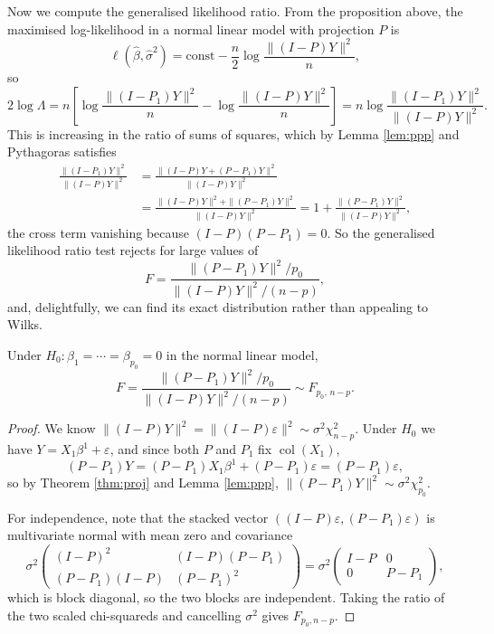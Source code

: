 \documentclass[a4paper]{scrartcl}
\newcommand{\col}{\operatorname{col}}
\begin{document}
Now we compute the generalised likelihood ratio. From the proposition above, the maximised log-likelihood in a normal linear model with projection $P$ is
$$
\ell(\hat\beta,\hat\sigma^2) = \text{const} - \frac{n}{2}\log\frac{\|(I-P)Y\|^2}{n},
$$
so
$$
2\log\Lambda = n\left[\log\frac{\|(I-P_1)Y\|^2}{n} - \log\frac{\|(I-P)Y\|^2}{n}\right] = n\log\frac{\|(I-P_1)Y\|^2}{\|(I-P)Y\|^2}.
$$
This is increasing in the ratio of sums of squares, which by Lemma \ref{lem:ppp} and Pythagoras satisfies
\begin{align*}
  \frac{\|(I-P_1)Y\|^2}{\|(I-P)Y\|^2} &= \frac{\|(I-P)Y + (P-P_1)Y\|^2}{\|(I-P)Y\|^2}\\
  &= \frac{\|(I-P)Y\|^2 + \|(P-P_1)Y\|^2}{\|(I-P)Y\|^2} = 1 + \frac{\|(P-P_1)Y\|^2}{\|(I-P)Y\|^2},
\end{align*}
the cross term vanishing because $(I-P)(P-P_1) = 0$. So the generalised likelihood ratio test rejects for large values of
$$
F = \frac{\|(P-P_1)Y\|^2/p_0}{\|(I-P)Y\|^2/(n-p)},
$$
and, delightfully, we can find its exact distribution rather than appealing to Wilks.

\begin{theorem}
  Under $H_0 : \beta_1 = \cdots = \beta_{p_0} = 0$ in the normal linear model,
  $$
  F = \frac{\|(P-P_1)Y\|^2/p_0}{\|(I-P)Y\|^2/(n-p)} \sim F_{p_0,\,n-p}.
  $$
\end{theorem}
\begin{proof}
  We know $\|(I-P)Y\|^2 = \|(I-P)\varepsilon\|^2\sim\sigma^2\chi^2_{n-p}$. Under $H_0$ we have $Y = X_1\beta^1 + \varepsilon$, and since both $P$ and $P_1$ fix $\col(X_1)$,
  $$
  (P-P_1)Y = (P-P_1)X_1\beta^1 + (P-P_1)\varepsilon = (P-P_1)\varepsilon,
  $$
  so by Theorem \ref{thm:proj} and Lemma \ref{lem:ppp}, $\|(P-P_1)Y\|^2\sim\sigma^2\chi^2_{p_0}$.

  For independence, note that the stacked vector $\left((I-P)\varepsilon, (P-P_1)\varepsilon\right)$ is multivariate normal with mean zero and covariance
  $$
  \sigma^2\begin{pmatrix}(I-P)^2 & (I-P)(P-P_1)\\(P-P_1)(I-P)&(P-P_1)^2\end{pmatrix} = \sigma^2\begin{pmatrix}I-P&0\\0&P-P_1\end{pmatrix},
  $$
  which is block diagonal, so the two blocks are independent. Taking the ratio of the two scaled chi-squareds and cancelling $\sigma^2$ gives $F_{p_0,n-p}$.
\end{proof}
\end{document}

